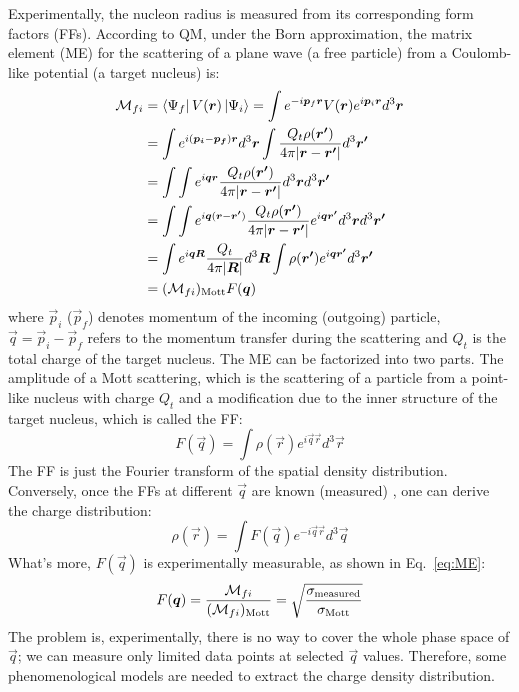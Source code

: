 Experimentally, the nucleon radius is measured from its corresponding form
factors (FFs). According to QM, under the Born approximation, the matrix element (ME) 
for the scattering of a plane wave (a free particle) from a Coulomb-like potential 
(a target nucleus) is:
\begin{equation}
    \begin{aligned}
	\CM_{fi} &= \bra{\Psi_f}V(\vec{r})\ket{\Psi_i} 
		= \int e^{-i\vec{p}_f\vec{r}}V(\vec{r}) e^{i\vec{p}_i\vec{r}} d^3\vec{r}    \\	%
	    &= \int e^{i(\vec{p_i} - \vec{p_f})\vec{r}} d^3\vec{r} 
		\int \frac{Q_t\rho(\vec{r'})}{4\pi|\vec{r} - \vec{r'}|} d^3\vec{r'} \\	%
	    &= \int \int e^{i\vec{q} \vec{r} } 
		 \frac{Q_t \rho(\vec{r'})}{4\pi|\vec{r} - \vec{r'}|} d^3\vec{r} d^3\vec{r'} \\	%
	    &= \int\int e^{i\vec{q}(\vec{r} - \vec{r'})} 
		\frac{Q_t\rho(\vec{r'})}{4\pi|\vec{r} - \vec{r'}|} e^{i\vec{q}\vec{r'}} d^3\vec{r} d^3\vec{r'}   \\  %
	    &= \int e^{i\vec{q}\vec{R}} \frac{Q_t}{4\pi|\vec{R}|} d^3\vec{R} 
		\int \rho(\vec{r'}) e^{i\vec{q} \vec{r'}}d^3 \vec{r'}	\\  %
	    &= (\CM_{fi})_{\text{Mott}} F(\vec{q})   \\	%
    \end{aligned}
    \label{eq:ME}
\end{equation}
where $\vec{p}_i$ ($\vec{p}_f$) denotes momentum of the incoming (outgoing) particle,
$\vec{q} = \vec{p}_i - \vec{p}_f$ refers to the momentum transfer during the scattering
and $Q_t$ is the total charge of the target nucleus. The ME can be factorized into two parts.
The amplitude of a Mott scattering, which is the scattering of a particle from 
a point-like nucleus with charge $Q_t$ and a modification
due to the inner structure of the target nucleus, which is called the FF:
\begin{equation}
    F(\vec{q}) = \int \rho(\vec{r}) e^{i\vec{q} \vec{r}} d^3\vec{r}
    \label{eq:ff}
\end{equation}
The FF is just the Fourier transform of the spatial density distribution.
Conversely, once the FFs at different $\vec{q}$ are known (measured) , one can
derive the charge distribution:
\begin{equation}
    \rho(\vec{r}) = \int F(\vec{q}) e^{-i\vec{q}\vec{r}} d^3\vec{q}
\end{equation}
What's more, $F(\vec{q})$ is experimentally measurable, as shown in Eq.~\ref{eq:ME}:
\begin{equation}
    F(\boldsymbol{q}) = \frac{\mathcal{M}_{fi}}{(\mathcal{M}_{fi})_{\text{Mott}}} 
	= \sqrt{\frac{\sigma_{\text{measured}}}{\sigma_{\text{Mott}}}} 
\end{equation}
The problem is, experimentally, there is no way to cover the whole phase space 
of $\vec{q}$; we can measure only limited data points at selected $\vec{q}$ values. 
Therefore, some phenomenological models are needed to extract the charge density distribution. 

